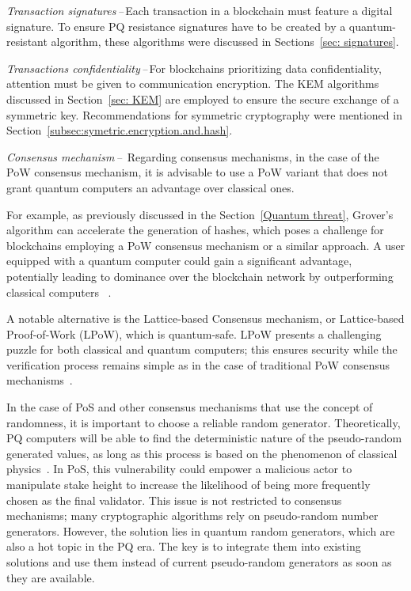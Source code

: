 \noindent\emph{Transaction signatures\,--\,}Each transaction in a blockchain must feature a digital signature. To ensure PQ resistance signatures have to be created by a quantum-resistant algorithm, these algorithms were discussed in Sections~\ref{sec: signatures}.

\noindent\emph{Transactions confidentiality\,--\,}For blockchains prioritizing data confidentiality, attention must be given to communication encryption. The KEM algorithms discussed in Section~\ref{sec: KEM} are employed to ensure the secure exchange of a symmetric key. Recommendations for symmetric cryptography were mentioned in Section~\ref{subsec:symetric.encryption.and.hash}.

\noindent\emph{Consensus mechanism\,--\,}
Regarding consensus mechanisms, in the case of the PoW consensus mechanism, it is advisable to use a PoW variant that does not grant quantum computers an advantage over classical ones.

For example, as previously discussed in the Section~\ref{Quantum threat}, Grover's algorithm can accelerate the generation of hashes, which poses a challenge for blockchains employing a PoW consensus mechanism or a similar approach. A user equipped with a quantum computer could gain a significant advantage, potentially leading to dominance over the blockchain network by outperforming classical computers~\cite{pqc.towards.bc.8967098}  .

A notable alternative is the Lattice-based Consensus mechanism, or Lattice-based Proof-of-Work (LPoW), which is quantum-safe. LPoW presents a challenging puzzle for both classical and quantum computers; this ensures security while the verification process remains simple as in the case of traditional PoW consensus mechanisms~\cite{PQ.consensus.solutions}.

In the case of PoS and other consensus mechanisms that use the concept of randomness, it is important to choose a reliable random generator. Theoretically, PQ computers will be able to find the deterministic nature of the pseudo-random generated values, as long as this process is based on the phenomenon of classical physics~\cite{PRNG.Jack}. In PoS, this vulnerability could empower a malicious actor to manipulate stake height to increase the likelihood of being more frequently chosen as the final validator. This issue is not restricted to consensus mechanisms; many cryptographic algorithms rely on pseudo-random number generators. However, the solution lies in quantum random generators, which are also a hot topic in the PQ era. The key is to integrate them into existing solutions and use them instead of current pseudo-random generators as soon as they are available.

